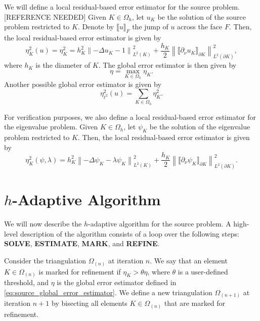 We will define a local residual-based error estimator for the source problem. [REFERENCE NEEDED]
Given \(K \in \Omega_h\), let \(u_K\) be the solution of the source problem restricted to \(K\).
Denote by \(\llbracket u \rrbracket_F\) the jump of \(u\) across the face \(F\).
Then, the local residual-based error estimator is given by
\begin{equation}
    \label{eq:source_error_estimator}
    \eta_K^2(u) =
    \eta_K^2 = h_K^2 \left\lVert -\Delta u_K - 1 \right\rVert_{L^2(K)}^2
         + \frac{h_K}{2} \left\lVert \llbracket \partial_\nu u_K \rrbracket_{\partial K} \right\rVert_{L^2(\partial K)}^2,
\end{equation}
where \(h_K\) is the diameter of \(K\).
The global error estimator is then given by
\begin{equation}
    \label{eq:source_global_error_estimator}
    \eta = \max_{K \in \Omega_h} \eta_K.
\end{equation}
Another possible global error estimator is given by
\begin{equation}
    \label{eq:source_global_error_estimator_alt}
    \eta^2_{\ell^2}(u) =
    \sum_{K \in \Omega_h} \eta_K^2.
\end{equation}

For verification purposes, we also define a local residual-based error estimator for the eigenvalue problem.
Given \(K \in \Omega_h\), let \(\psi_K\) be the solution of the eigenvalue problem restricted to \(K\).
Then, the local residual-based error estimator is given by
\begin{equation}
    \label{eq:eigenvalue_error_estimator}
    \eta_K^2(\psi, \lambda) =
    h_K^2 \left\lVert -\Delta \psi_K - \lambda \psi_K \right\rVert_{L^2(K)}^2
        + \frac{h_K}{2} \left\lVert \llbracket \partial_\nu \psi_K \rrbracket_{\partial K} \right\rVert_{L^2(\partial K)}^2.
\end{equation}

\section{\(h\)-Adaptive Algorithm}

We will now describe the \(h\)-adaptive algorithm for the source problem.
A high-level description of the algorithm consists of a loop over the following steps:
\textbf{SOLVE}, \textbf{ESTIMATE}, \textbf{MARK}, and \textbf{REFINE}.

Consider the triangulation \(\Omega_{(n)}\) at iteration \(n\).
We say that an element \(K \in \Omega_{(n)}\) is marked for refinement if \(\eta_K > \theta \eta\), where \(\theta\) is a user-defined threshold, and \(\eta\) is the global error estimator defined in \eqref{eq:source_global_error_estimator}.
We define a new triangulation \(\Omega_{(n+1)}\) at iteration \(n+1\) by bisecting all elements \(K \in \Omega_{(n)}\) that are marked for refinement.

